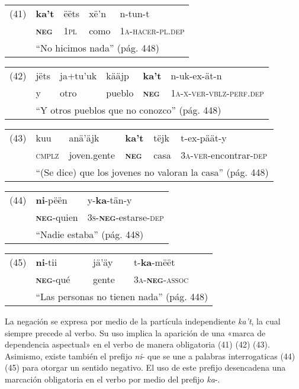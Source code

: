 {\setmainfont{Charis SIL} 

\begin{tabular}{lllll}
(41) & \textbf{ka't} & ëëts & xë'n & n-tun-t \\
& \textsc{\textbf{neg}} & \textsc{1pl} & como & \textsc{1a-hacer-pl.dep} \\
& \multicolumn{4}{l}{``No hicimos nada'' (pág. 448)}
\end{tabular} \vspace{0.3cm}

\begin{tabular}{llllll}
(42) & jëts & ja+tu'uk & kääjp & \textbf{ka't} & n-uk-ex-ät-n \\
& y & otro & pueblo & \textsc{\textbf{neg}} & \textsc{1a-x-ver-vblz-perf.dep} \\
& \multicolumn{5}{l}{``Y otros pueblos que no conozco'' (pág. 448)}
\end{tabular} \vspace{0.3cm}

\begin{tabular}{llllll}
(43) & kuu & anä'äjk & \textbf{ka't} & tëjk & t-ex-päät-y \\
& \textsc{cmplz} & joven.gente & \textsc{\textbf{neg}} & casa & \textsc{3a-ver}-encontrar-\textsc{dep} \\
& \multicolumn{5}{l}{``(Se dice) que los jovenes no valoran la casa'' (pág. 448)}
\end{tabular} \vspace{0.3cm}

\begin{tabular}{lll}
(44) & \textbf{ni}-pëën & y-\textbf{ka}-tän-y \\
& \textsc{\textbf{neg}}-quien & \textsc{3s-\textbf{neg}}-estarse-\textsc{dep} \\
& \multicolumn{2}{l}{``Nadie estaba'' (pág. 448)}
\end{tabular} \vspace{0.5cm}

\begin{tabular}{llll}
(45) & \textbf{ni}-tii & jä'äy & t-\textbf{ka}-mëët \\
& \textsc{\textbf{neg}}-qué & gente & \textsc{3a-\textbf{neg}-assoc} \\
& \multicolumn{3}{l}{``Las personas no tienen nada'' (pág. 448)}
\end{tabular} \vspace{0.5cm}

}

La negación se expresa por medio de la partícula independiente {\setmainfont{Charis SIL} \textit{ka't}}, la cual siempre precede al verbo. Su uso implica la aparición de una «marca de dependencia aspectual» \textcolor{MidnightBlue}{\citep{mixe}} en el verbo de manera obligatoria (41) (42) (43). Asimismo, existe también el prefijo {\setmainfont{Charis SIL} \textit{ni}-} que se une a palabras interrogaticas (44) (45) para otorgar un sentido negativo. El uso de este prefijo desencadena una marcación obligatoria en el verbo por medio del prefijo {\setmainfont{Charis SIL} \textit{ka}-}.